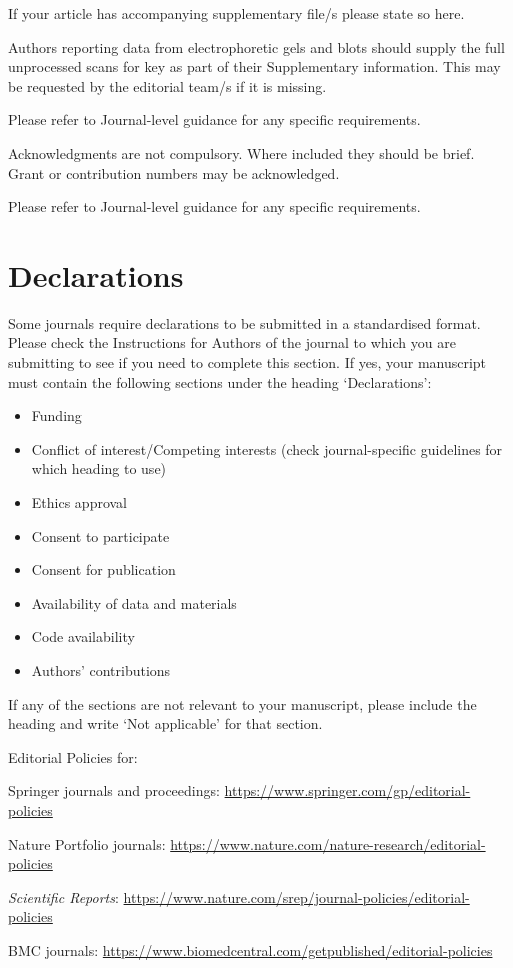 \documentclass[sn-apa,pdflatex]{sn-jnl}
\theoremstyle{remark}
\theoremstyle{definition}
\providecommand{\tightlist}{%
  \setlength{\itemsep}{0pt}\setlength{\parskip}{0pt}}
\begin{document}
\backmatter


If your article has accompanying supplementary file/s please state so
here.

Authors reporting data from electrophoretic gels and blots should supply
the full unprocessed scans for key as part of their Supplementary
information. This may be requested by the editorial team/s if it is
missing.

Please refer to Journal-level guidance for any specific requirements.


Acknowledgments are not compulsory. Where included they should be brief.
Grant or contribution numbers may be acknowledged.

Please refer to Journal-level guidance for any specific requirements.

\hypertarget{declarations}{%
\section*{Declarations}\label{declarations}}

Some journals require declarations to be submitted in a standardised
format. Please check the Instructions for Authors of the journal to
which you are submitting to see if you need to complete this section. If
yes, your manuscript must contain the following sections under the
heading `Declarations':

\begin{itemize}
\tightlist
\item
  Funding
\item
  Conflict of interest/Competing interests (check journal-specific
  guidelines for which heading to use)
\item
  Ethics approval
\item
  Consent to participate
\item
  Consent for publication
\item
  Availability of data and materials
\item
  Code availability
\item
  Authors' contributions
\end{itemize}

\noindent If any of the sections are not relevant to your manuscript,
please include the heading and write `Not applicable' for that section.

\begin{flushleft}
Editorial Policies for:

\noindent Springer journals and proceedings:
\url{https://www.springer.com/gp/editorial-policies}

\noindent Nature Portfolio journals:
\url{https://www.nature.com/nature-research/editorial-policies}

\noindent \textit{Scientific Reports}:
\url{https://www.nature.com/srep/journal-policies/editorial-policies}

\noindent BMC journals:
\url{https://www.biomedcentral.com/getpublished/editorial-policies}

\end{flushleft}
\end{document}
